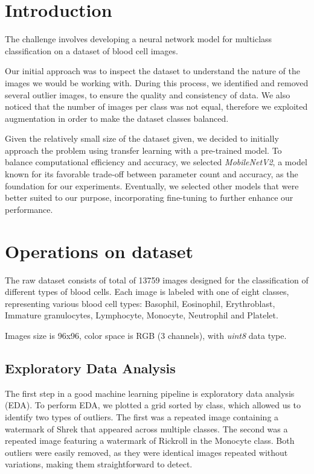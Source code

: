 \documentclass[11pt]{article}
\begin{document}
\section{Introduction}

The challenge involves developing a neural network model for multiclass classification on a dataset of blood cell images.

Our initial approach was to inspect the dataset to understand the nature of the images we would be working with. During this process, we identified and removed several outlier images, to ensure the quality and consistency of data. We also noticed that the number of images per class was not equal, therefore we exploited augmentation in order to make the dataset classes balanced.

Given the relatively small size of the dataset given, we decided to initially approach the problem using transfer learning with a pre-trained model. To balance computational efficiency and accuracy, we selected \textit{MobileNetV2}, a model known for its favorable trade-off between parameter count and accuracy, as the foundation for our experiments. Eventually, we selected other models that were better suited to our purpose, incorporating fine-tuning to further enhance our performance.

\section{Operations on dataset}
The raw dataset consists of total of 13759 images designed for the classification of different types of blood cells. Each image is labeled with one of eight classes, representing various blood cell types: Basophil, Eosinophil, Erythroblast,  Immature granulocytes, Lymphocyte, Monocyte, Neutrophil and Platelet.

Images size is 96x96, color space is RGB (3 channels), with \textit{uint8} data type.

\subsection{Exploratory Data Analysis}

The first step in a good machine learning pipeline is exploratory data analysis (EDA). To perform EDA, we plotted a grid sorted by class, which allowed us to identify two types of outliers. The first was a repeated image containing a watermark of Shrek that appeared across multiple classes. The second was a repeated image featuring a watermark of Rickroll in the Monocyte class. Both outliers were easily removed, as they were identical images repeated without variations, making them straightforward to detect.
\end{document}

